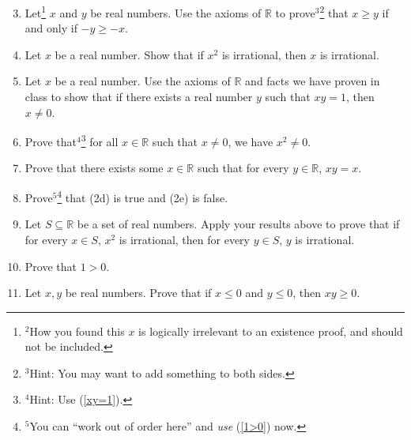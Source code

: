 \documentclass[12pt]{amsart}
\newcommand{\R}{{\mathbb{R}}}
\numberwithin{equation}{section}
\theoremstyle{plain} %
\theoremstyle{definition}
\theoremstyle{remark}
\begin{document}
\begin{enumerate}\setcounter{enumi}{2}
\item Let\footnote{$^{\textrm{2}}$How you found this $x$ is logically irrelevant to an existence proof, and should not be included.} $x$ and $y$ be real numbers. Use the axioms of $\R$ to prove$^{\textrm{3}}$\footnote{$^{\textrm{3}}$Hint: You may want to add something to both sides.} that $x \geq y$ if and only if $-y\geq -x$.



\item Let $x$ be a real number. Show that if $x^2$ is irrational, then $x$ is irrational.



\item\label{xy=1} Let $x$ be a real number. Use the axioms of $\R$ and facts we have proven in class to show that if there exists a real number $y$ such that $xy=1$, then $x\neq 0$.



\item Prove that$^{\textrm{4}}$\footnote{$^{\textrm{4}}$Hint: Use (\ref{xy=1}).} for all $x\in \R$ such that $x\neq 0$, we have $x^2\neq 0$.


\item Prove that there exists some $x\in \R$ such that for every $y\in \R$, $xy=x$.



\item Prove$^{\textrm{5}}$\footnote{$^{\textrm{5}}$You can ``work out of order here'' and \emph{use} (\ref{1>0}) now.} that (2d) is true and (2e) is false. 



\item Let $S\subseteq \R$ be a set of real numbers. Apply your results above to prove that if for every $x\in S$, $x^2$ is irrational, then for every $y\in S$, $y$ is irrational.



\item\label{1>0} Prove that $1>0$.



\item Let $x,y$ be real numbers. Prove that if $x\leq 0$ and $y\leq 0$, then $xy\geq 0$.

\end{enumerate}
\end{document}
